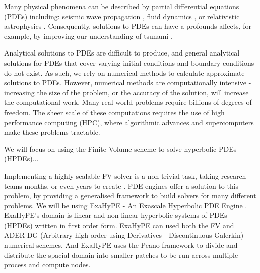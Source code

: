 











Many physical phenomena can be described by partial differential equations (PDEs) including:  seismic wave propagation \cite{earthquakePDE}, fluid dynamics \cite{exahype}, or relativistic astrophysics \cite{relativisticPDE}.
Consequently, solutions to PDEs can have a profounds affects, for example, by improving our understanding of tsunami \cite{tsunamiPDE}.


Analytical solutions to PDEs are difficult to produce, and general analytical solutions for PDEs that cover varying initial conditions and boundary conditions do not exist.
As such, we rely on numerical methods to calculate approximate solutions to PDEs.
However, numerical methods are computationally intensive - increasing the size of the problem, or the accuracy of the solution, will increase the computational work.
Many real world problems require billions of degrees of freedom.
The sheer scale of these computations requires the use of high performance computing (HPC), where algorithmic advances and supercomputers make these problems tractable.

We will focus on using the Finite Volume scheme to solve hyperbolic PDEs (HPDEs)...



Implementing a highly scalable FV solver is a non-trivial task, taking research teams months, or even years to create \cite{tensorChemistry}.
PDE engines offer a solution to this problem, by providing a generalised framework to build solvers for many different problems.
We will be using ExaHyPE - An Exascale Hyperbolic PDE Engine \cite{exahype}.
ExaHyPE's domain is linear and non-linear hyperbolic systems of PDEs (HPDEs) written in first order form. 
ExaHyPE can used both the FV and ADER-DG (Arbitrary high-order using Derivatives - Discontinuous Galerkin) numerical schemes.
And ExaHyPE uses the Peano framework \cite{PeanoFramework} to divide and distribute the spacial domain into smaller patches to be run across multiple process and compute nodes.

